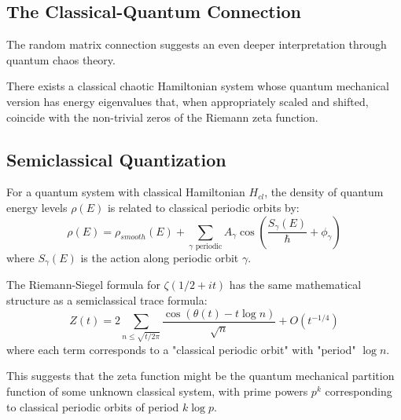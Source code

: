 \subsection{The Classical-Quantum Connection}

The random matrix connection suggests an even deeper interpretation through quantum chaos theory.

\begin{conjecture}
\label{conj:berry_keating}
There exists a classical chaotic Hamiltonian system whose quantum mechanical version has energy eigenvalues that, when appropriately scaled and shifted, coincide with the non-trivial zeros of the Riemann zeta function.
\end{conjecture}

\subsection{Semiclassical Quantization}

\begin{definition}
For a quantum system with classical Hamiltonian $H_{cl}$, the density of quantum energy levels $\rho(E)$ is related to classical periodic orbits by:
\begin{equation}
\rho(E) = \rho_{smooth}(E) + \sum_{\gamma \text{ periodic}} A_\gamma \cos\left(\frac{S_\gamma(E)}{\hbar} + \phi_\gamma\right)
\end{equation}
where $S_\gamma(E)$ is the action along periodic orbit $\gamma$.
\end{definition}

\begin{theorem}
\label{thm:semiclassical_interpretation}
The Riemann-Siegel formula for $\zeta(1/2 + it)$ has the same mathematical structure as a semiclassical trace formula:
\begin{equation}
Z(t) = 2 \sum_{n \leq \sqrt{t/2\pi}} \frac{\cos(\theta(t) - t\log n)}{\sqrt{n}} + O(t^{-1/4})
\end{equation}
where each term corresponds to a "classical periodic orbit" with "period" $\log n$.
\end{theorem}

\begin{remark}
This suggests that the zeta function might be the quantum mechanical partition function of some unknown classical system, with prime powers $p^k$ corresponding to classical periodic orbits of period $k \log p$.
\end{remark}

